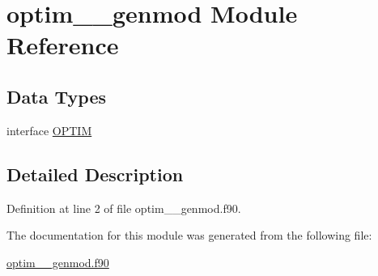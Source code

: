 \hypertarget{classoptim____genmod}{\section{optim\+\_\+\+\_\+genmod Module Reference}
\label{classoptim____genmod}
}
\subsection*{Data Types}
\begin{DoxyCompactItemize}
\item 
interface \hyperlink{interfaceoptim____genmod_1_1OPTIM}{O\+P\+T\+I\+M}
\end{DoxyCompactItemize}


\subsection{Detailed Description}


Definition at line 2 of file optim\+\_\+\+\_\+genmod.\+f90.



The documentation for this module was generated from the following file\+:\begin{DoxyCompactItemize}
\item 
\hyperlink{optim____genmod_8f90}{optim\+\_\+\+\_\+genmod.\+f90}\end{DoxyCompactItemize}
